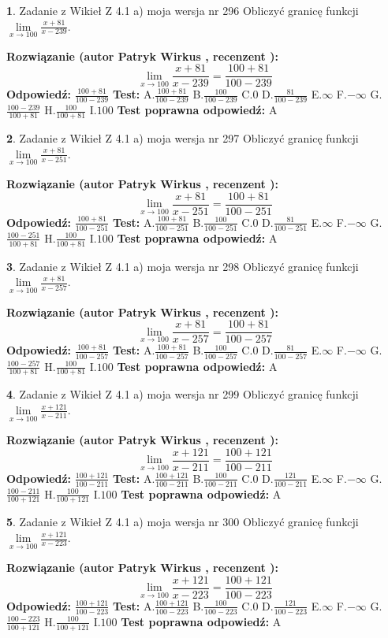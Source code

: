 \documentclass[12pt, a4paper]{article}
\theoremstyle{definition} %
\newtheorem{zad}{}
\newcommand{\zadStart}[1]{\begin{zad}#1\newline}
\newcommand{\zadStop}{\end{zad}}
\newcommand{\rozwStart}[2]{\noindent \textbf{Rozwiązanie (autor #1 , recenzent #2): }\newline}
\newcommand{\rozwStop}{\newline}
\newcommand{\odpStart}{\noindent \textbf{Odpowiedź:}\newline}
\newcommand{\odpStop}{\newline}
\newcommand{\testStart}{\noindent \textbf{Test:}\newline}
\newcommand{\testStop}{\newline}
\newcommand{\kluczStart}{\noindent \textbf{Test poprawna odpowiedź:}\newline}
\newcommand{\kluczStop}{\newline}
\begin{document}
\zadStart{Zadanie z Wikieł Z 4.1 a) moja wersja nr 296}
Obliczyć granicę funkcji $\lim\limits_{x\to100}\frac{x+81}{x-239}$.
\zadStop
\rozwStart{Patryk Wirkus}{}
$$\lim\limits_{x\to100}\frac{x+81}{x-239} = \frac{100+81}{100-239}$$
\rozwStop
\odpStart
$\frac{100+81}{100-239}$
\odpStop
\testStart
A.$\frac{100+81}{100-239}$
B.$\frac{100}{100-239}$
C.$0$
D.$\frac{81}{100-239}$
E.$\infty$
F.$-\infty$
G.$\frac{100-239}{100+81}$
H.$\frac{100}{100+81}$
I.$100$
\testStop
\kluczStart
A
\kluczStop



\zadStart{Zadanie z Wikieł Z 4.1 a) moja wersja nr 297}
Obliczyć granicę funkcji $\lim\limits_{x\to100}\frac{x+81}{x-251}$.
\zadStop
\rozwStart{Patryk Wirkus}{}
$$\lim\limits_{x\to100}\frac{x+81}{x-251} = \frac{100+81}{100-251}$$
\rozwStop
\odpStart
$\frac{100+81}{100-251}$
\odpStop
\testStart
A.$\frac{100+81}{100-251}$
B.$\frac{100}{100-251}$
C.$0$
D.$\frac{81}{100-251}$
E.$\infty$
F.$-\infty$
G.$\frac{100-251}{100+81}$
H.$\frac{100}{100+81}$
I.$100$
\testStop
\kluczStart
A
\kluczStop



\zadStart{Zadanie z Wikieł Z 4.1 a) moja wersja nr 298}
Obliczyć granicę funkcji $\lim\limits_{x\to100}\frac{x+81}{x-257}$.
\zadStop
\rozwStart{Patryk Wirkus}{}
$$\lim\limits_{x\to100}\frac{x+81}{x-257} = \frac{100+81}{100-257}$$
\rozwStop
\odpStart
$\frac{100+81}{100-257}$
\odpStop
\testStart
A.$\frac{100+81}{100-257}$
B.$\frac{100}{100-257}$
C.$0$
D.$\frac{81}{100-257}$
E.$\infty$
F.$-\infty$
G.$\frac{100-257}{100+81}$
H.$\frac{100}{100+81}$
I.$100$
\testStop
\kluczStart
A
\kluczStop



\zadStart{Zadanie z Wikieł Z 4.1 a) moja wersja nr 299}
Obliczyć granicę funkcji $\lim\limits_{x\to100}\frac{x+121}{x-211}$.
\zadStop
\rozwStart{Patryk Wirkus}{}
$$\lim\limits_{x\to100}\frac{x+121}{x-211} = \frac{100+121}{100-211}$$
\rozwStop
\odpStart
$\frac{100+121}{100-211}$
\odpStop
\testStart
A.$\frac{100+121}{100-211}$
B.$\frac{100}{100-211}$
C.$0$
D.$\frac{121}{100-211}$
E.$\infty$
F.$-\infty$
G.$\frac{100-211}{100+121}$
H.$\frac{100}{100+121}$
I.$100$
\testStop
\kluczStart
A
\kluczStop



\zadStart{Zadanie z Wikieł Z 4.1 a) moja wersja nr 300}
Obliczyć granicę funkcji $\lim\limits_{x\to100}\frac{x+121}{x-223}$.
\zadStop
\rozwStart{Patryk Wirkus}{}
$$\lim\limits_{x\to100}\frac{x+121}{x-223} = \frac{100+121}{100-223}$$
\rozwStop
\odpStart
$\frac{100+121}{100-223}$
\odpStop
\testStart
A.$\frac{100+121}{100-223}$
B.$\frac{100}{100-223}$
C.$0$
D.$\frac{121}{100-223}$
E.$\infty$
F.$-\infty$
G.$\frac{100-223}{100+121}$
H.$\frac{100}{100+121}$
I.$100$
\testStop
\kluczStart
A
\kluczStop
\end{document}
